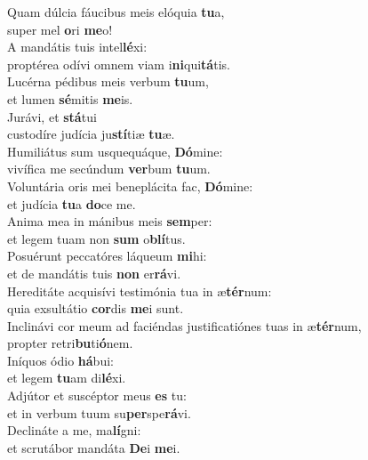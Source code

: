\oddverse Quam dúlcia fáucibus meis elóquia \textbf{tu}a,~\*\\
\oddverse super mel \textbf{o}ri \textbf{me}o!\\
\evenverse A mandátis tuis intel\textbf{lé}xi:~\*\\
\evenverse proptérea odívi omnem viam i\textbf{ni}qui\textbf{tá}tis.\\
\oddverse Lucérna pédibus meis verbum \textbf{tu}um,~\*\\
\oddverse et lumen \textbf{sé}mitis \textbf{me}is.\\
\evenverse Jurávi, et \textbf{stá}tui~\*\\
\evenverse custodíre judícia ju\textbf{stí}tiæ \textbf{tu}æ.\\
\oddverse Humiliátus sum usquequáque, \textbf{Dó}mine:~\*\\
\oddverse vivífica me secúndum \textbf{ver}bum \textbf{tu}um.\\
\evenverse Voluntária oris mei beneplácita fac, \textbf{Dó}mine:~\*\\
\evenverse et judícia \textbf{tu}a \textbf{do}ce me.\\
\oddverse Anima mea in mánibus meis \textbf{sem}per:~\*\\
\oddverse et legem tuam non \textbf{sum} o\textbf{blí}tus.\\
\evenverse Posuérunt peccatóres láqueum \textbf{mi}hi:~\*\\
\evenverse et de mandátis tuis \textbf{non} er\textbf{rá}vi.\\
\oddverse Hereditáte acquisívi testimónia tua in æ\textbf{tér}num:~\*\\
\oddverse quia exsultátio \textbf{cor}dis \textbf{me}i sunt.\\
\evenverse Inclinávi cor meum ad faciéndas justificatiónes tuas in æ\textbf{tér}num,~\*\\
\evenverse propter retri\textbf{bu}ti\textbf{ó}nem.\\
\oddverse Iníquos ódio \textbf{há}bui:~\*\\
\oddverse et legem \textbf{tu}am di\textbf{lé}xi.\\
\evenverse Adjútor et suscéptor meus \textbf{es} tu:~\*\\
\evenverse et in verbum tuum su\textbf{per}spe\textbf{rá}vi.\\
\oddverse Declináte a me, ma\textbf{lí}gni:~\*\\
\oddverse et scrutábor mandáta \textbf{De}i \textbf{me}i.\\
